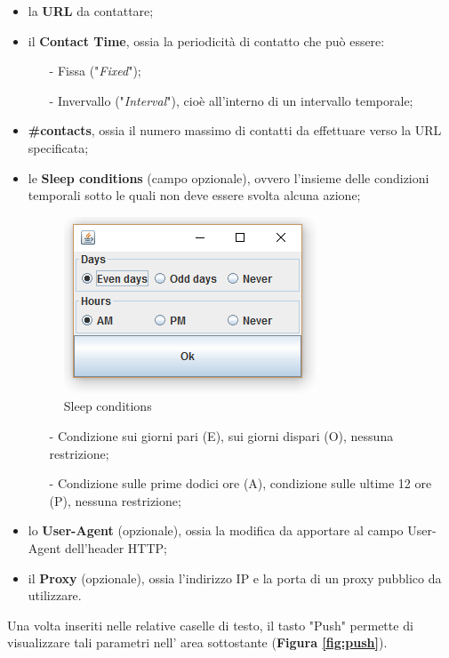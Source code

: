 \begin{itemize} 
\item la \textbf{URL} da contattare;
\item il \textbf{Contact Time}, ossia la periodicit\`{a} di contatto che pu\`{o} essere:
\begin{itemize}
\item [-] Fissa ("\textit{Fixed}");
\item [-] Invervallo ("\textit{Interval}"), cio\`e all'interno di un intervallo temporale;
\end{itemize} 
\item \textbf{\#contacts}, ossia il numero massimo di contatti da effettuare verso la URL specificata;
\item le \textbf{Sleep conditions} (campo opzionale), ovvero l'insieme delle condizioni temporali sotto le quali non deve essere svolta alcuna azione; 
\begin{figure}[!htb]
        \centering
		\includegraphics[width=0.4\linewidth]{./imgs/sleep}
        \caption{Sleep conditions}
\end{figure}
\begin{itemize}
\item [-] Condizione sui giorni pari (E), sui giorni dispari (O), nessuna restrizione;
\item [-] Condizione sulle prime dodici ore (A), condizione sulle ultime 12 ore (P), nessuna restrizione;
\end{itemize}
\item lo \textbf{User-Agent} (opzionale), ossia la modifica da apportare al campo User-Agent dell'header HTTP;
\item il \textbf{Proxy} (opzionale), ossia l'indirizzo IP e la porta di un proxy pubblico da utilizzare.
\end{itemize} 

Una volta inseriti nelle relative caselle di testo, il tasto "Push" permette di visualizzare tali parametri nell' area sottostante (\textbf{Figura \ref{fig:push}}). 

